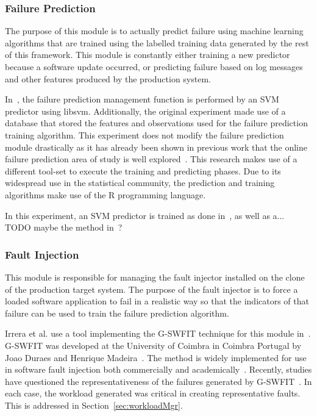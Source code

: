 \subsubsection{Failure Prediction} \label{sec:failurePrediction} %
The purpose of this module is to actually predict failure using machine
learning algorithms that are trained using the labelled training data generated
by the rest of this framework.  This module is constantly either training
a new predictor because a software update occurred, or predicting failure based
on log messages and other features produced by the production system.

In~\cite{irrera2015}, the failure prediction management function is performed
by an SVM predictor using libsvm.  Additionally, the original experiment made
use of a database that stored the features and observations used for the
failure prediction training algorithm.  This experiment does not modify the
failure prediction module drastically as it has already been shown in previous
work that the online failure prediction area of study is well
explored~\cite{salfnerSurvey}.  This research makes use of a different tool-set
to execute the training and predicting phases.  Due to its widespread use in
the statistical community, the prediction and training algorithms make use of
the R programming language.

In this experiment, an SVM predictor is trained as done in~\cite{irrera2015},
as well as a... TODO maybe the method in~\cite{watanabe2014}?

\subsubsection{Fault Injection} \label{sec:faultInjectionMgr}
This module is responsible for managing the fault injector installed on the
clone of the production target system.  The purpose of the fault injector is to
force a loaded software application to fail in a realistic way so that the
indicators of that failure can be used to train the failure prediction
algorithm.

Irrera et al. use a tool implementing the G-SWFIT technique for this module
in~\cite{irrera2015}.  G-SWFIT was developed at the University of Coimbra in
Coimbra Portugal by Joao Duraes and Henrique Madeira~\cite{gswfit}.  The method
is widely implemented for use in software fault injection both commercially and
academically~\cite{natella2010,irrera2014,cotroneo2012,umadevi2015}.  Recently,
studies have questioned the representativeness of the failures generated by
G-SWFIT~\cite{kikuchi2014}.  In each case, the workload generated was critical
in creating representative faults.  This is addressed in
Section~\ref{sec:workloadMgr}.

